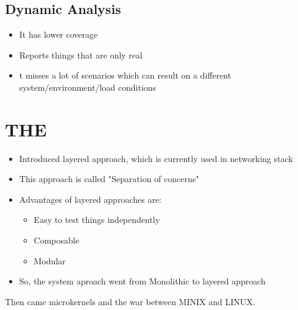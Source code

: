 \documentclass[twoside]{article}
\begin{document}
\subsection{Dynamic Analysis}
\begin{itemize}
	\item It has lower coverage
	\item Reports things that are only real
	\item t misses a lot of scenarios which can result on a different system/environment/load conditions
\end{itemize}

\section{THE}
\begin{itemize}
	\item Introduced layered approach, which is currently used in networking stack
	\item This approach is called "Separation of concerns"
	\item Advantages of layered approaches are:
		\begin{itemize}
			\item Easy to test things independently
			\item Composable
			\item Modular
		\end{itemize}
	\item So, the system aproach went from Monolithic to layered approach
\end{itemize}
Then came microkernels and the war between MINIX and LINUX.
\end{document}
